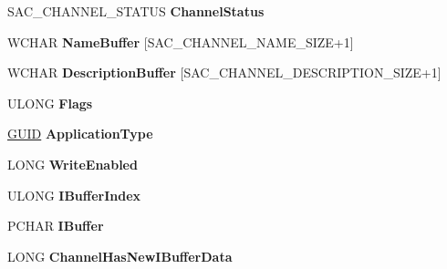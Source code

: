 \begin{DoxyCompactItemize}
\mbox{\label{struct___s_a_c___c_h_a_n_n_e_l_aa948999287ccccd1d4517c1c72ff04ca}} 
S\+A\+C\+\_\+\+C\+H\+A\+N\+N\+E\+L\+\_\+\+S\+T\+A\+T\+US {\bfseries Channel\+Status}
\item 
\mbox{\label{struct___s_a_c___c_h_a_n_n_e_l_a6e763eb40db522ccd0ad57e24229dd2a}} 
W\+C\+H\+AR {\bfseries Name\+Buffer} \mbox{[}S\+A\+C\+\_\+\+C\+H\+A\+N\+N\+E\+L\+\_\+\+N\+A\+M\+E\+\_\+\+S\+I\+ZE+1\mbox{]}
\item 
\mbox{\label{struct___s_a_c___c_h_a_n_n_e_l_ae4d652a37267adff0d2a34af5f6955c6}} 
W\+C\+H\+AR {\bfseries Description\+Buffer} \mbox{[}S\+A\+C\+\_\+\+C\+H\+A\+N\+N\+E\+L\+\_\+\+D\+E\+S\+C\+R\+I\+P\+T\+I\+O\+N\+\_\+\+S\+I\+ZE+1\mbox{]}
\item 
\mbox{\label{struct___s_a_c___c_h_a_n_n_e_l_a67d3ba2bb250739e039900c06dc49c7f}} 
U\+L\+O\+NG {\bfseries Flags}
\item 
\mbox{\label{struct___s_a_c___c_h_a_n_n_e_l_ad5d6f552565cf26850411cd877403c82}} 
\hyperlink{interface_g_u_i_d}{G\+U\+ID} {\bfseries Application\+Type}
\item 
\mbox{\label{struct___s_a_c___c_h_a_n_n_e_l_ae6e435769563a916a20c5fb4fc7ab928}} 
L\+O\+NG {\bfseries Write\+Enabled}
\item 
\mbox{\label{struct___s_a_c___c_h_a_n_n_e_l_a9daad125ba5cfc91012cac219e7bfecd}} 
U\+L\+O\+NG {\bfseries I\+Buffer\+Index}
\item 
\mbox{\label{struct___s_a_c___c_h_a_n_n_e_l_aa8a301261d10a88fcfe3f2676223cb5a}} 
P\+C\+H\+AR {\bfseries I\+Buffer}
\item 
\mbox{\label{struct___s_a_c___c_h_a_n_n_e_l_a735e9f003b325d8507f8e7704fa8118e}} 
L\+O\+NG {\bfseries Channel\+Has\+New\+I\+Buffer\+Data}
\item 
\mbox{\label{struct___s_a_c___c_h_a_n_n_e_l_a7e3acaa48236ecfdad0b22806fb4f823}} 

\end{DoxyCompactItemize}
